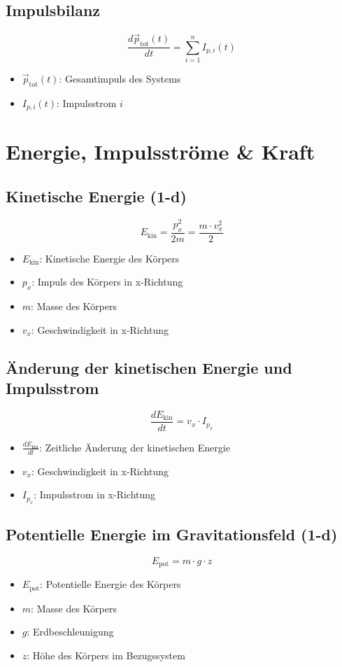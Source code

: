 \documentclass[a4paper, 8pt]{extarticle}
\begin{document}
\begin{landscape}
\begin{multicols*}{3}
\subsection{Impulsbilanz}
\[
\frac{d\vec{p}_{\text{tot}}(t)}{dt} = \sum_{i=1}^n I_{p,i}(t)
\]
\begin{itemize}
    \item \( \vec{p}_{\text{tot}}(t) \): Gesamtimpuls des Systems
    \item \( I_{p,i}(t) \): Impulsstrom \( i \)
\end{itemize}
\section{Energie, Impulsströme & Kraft}

\subsection{Kinetische Energie (1-d)}
\[
E_{\text{kin}} = \frac{p_x^2}{2m} = \frac{m \cdot v_x^2}{2}
\]
{\footnotesize
\begin{itemize}
    \item \( E_{\text{kin}} \): Kinetische Energie des Körpers
    \item \( p_x \): Impuls des Körpers in x-Richtung
    \item \( m \): Masse des Körpers
    \item \( v_x \): Geschwindigkeit in x-Richtung
\end{itemize}
}

\subsection{Änderung der kinetischen Energie und Impulsstrom}
\[
\frac{dE_{\text{kin}}}{dt} = v_x \cdot I_{p_x}
\]
{\footnotesize
\begin{itemize}
    \item \( \frac{dE_{\text{kin}}}{dt} \): Zeitliche Änderung der kinetischen Energie
    \item \( v_x \): Geschwindigkeit in x-Richtung
    \item \( I_{p_x} \): Impulsstrom in x-Richtung
\end{itemize}
}

\subsection{Potentielle Energie im Gravitationsfeld (1-d)}
\[
E_{\text{pot}} = m \cdot g \cdot z
\]
{\footnotesize
\begin{itemize}
    \item \( E_{\text{pot}} \): Potentielle Energie des Körpers
    \item \( m \): Masse des Körpers
    \item \( g \): Erdbeschleunigung
    \item \( z \): Höhe des Körpers im Bezugssystem
\end{itemize}
}


\end{multicols*}
\end{landscape}
\end{document}
